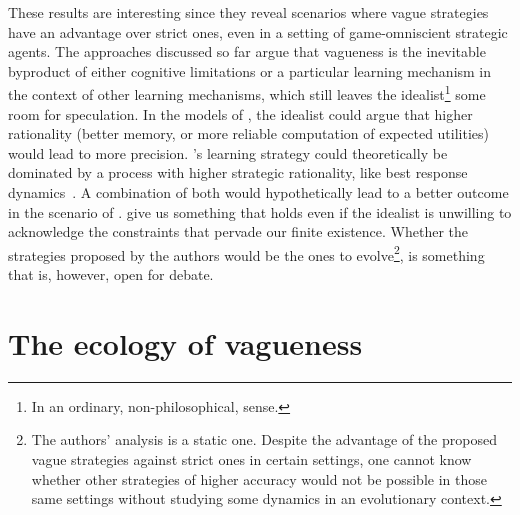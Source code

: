 \documentclass[a4paper]{article}
\begin{document}
These results are interesting since they reveal scenarios where vague strategies have an advantage over strict ones, even in a setting of game-omniscient strategic agents.
The approaches discussed so far argue that vagueness is the inevitable byproduct of either cognitive limitations or a particular learning mechanism in the context of other learning mechanisms, which still leaves the idealist\footnote{In an ordinary, non-philosophical, sense.} some room for speculation.
In the models of \citeauthor{franke_vagueness_2011}, the idealist could argue that higher rationality (better memory, or more reliable computation of expected utilities) would lead to more precision.
\citeauthor{oconnor_evolving_2015}'s learning strategy could theoretically be dominated by a process with higher strategic rationality, like best response dynamics~\parencite{gilboa_social_1991}.
A combination of both would hypothetically lead to a better outcome in the scenario of \citeauthor{franke_vagueness_2017}.
\citeauthor{lawry_vagueness_2017} give us something that holds even if the idealist is unwilling to acknowledge the constraints that pervade our finite existence.
Whether the strategies proposed by the authors would be the ones to evolve\footnote{The authors' analysis is a static one. Despite the advantage of the proposed vague strategies against strict ones in certain settings, one cannot know whether other strategies of higher accuracy would not be possible in those same settings without studying some dynamics in an evolutionary context.}, is something that is, however, open for debate.


\section{The ecology of vagueness}
\label{sec:ecology-of-vagueness}
\end{document}
